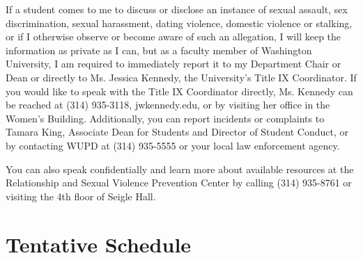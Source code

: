 \documentclass[11pt]{article}
\begin{document}
If a student comes to me to discuss or disclose an instance of sexual assault, sex discrimination, sexual harassment, dating violence, domestic violence or stalking, or if I otherwise observe or become aware of such an allegation, I will keep the information as private as I can, but as a faculty member of Washington University, I am required to immediately report it to my Department Chair or Dean or directly to Ms. Jessica Kennedy, the University’s Title IX Coordinator.  If you would like to speak with the Title IX Coordinator directly, Ms. Kennedy can be reached at (314) 935-3118, jwkennedy\@@wustl.edu, or by visiting her office in the Women’s Building.  Additionally, you can report incidents or complaints to Tamara King, Associate Dean for Students and Director of Student Conduct, or by contacting WUPD at (314) 935-5555 or your local law enforcement agency.  

You can also speak confidentially and learn more about available resources at the Relationship and Sexual Violence Prevention Center by calling (314) 935-8761 or visiting the 4th floor of Seigle Hall.




\section*{Tentative Schedule}
\end{document}
